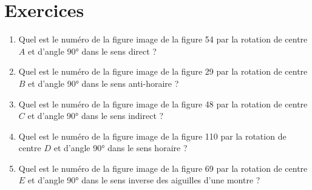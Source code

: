 \documentclass[main.tex]{subfiles}
\begin{document}

\newpage 
{}  
\pagestyle{scrheadings} %
\onehalfspacing
\section{Exercices}


\begin{figure}[h]
\end{figure}
\begin{exercise} \hfill 
	\begin{enumerate}[label=\arabic*),leftmargin=*]
		\item Quel est le numéro de la figure image de la figure 54 par la rotation de centre $A$ et d'angle \ang{90} dans le sens  direct ?
		\item Quel est le numéro de la figure image de la figure 29 par la rotation de centre $B$ et d'angle \ang{90} dans le sens anti-horaire ?
		\item Quel est le numéro  de la figure image de la figure 48 par la rotation de centre $C$ et d'angle \ang{90} dans le sens indirect ?
		\item Quel est le numéro de la figure image de la figure 110 par la rotation de centre $D$ et d'angle \ang{90} dans le sens horaire ?
		\item Quel est le numéro de la figure image de la figure 69 par la rotation de centre $E$ et d'angle \ang{90} dans le sens inverse des aiguilles d'une montre ?
	\end{enumerate}
\end{exercise}
\end{document}
